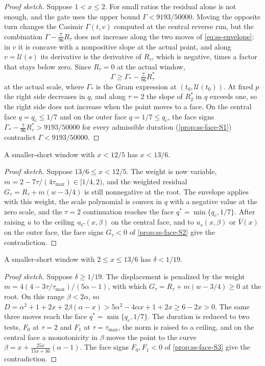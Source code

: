 \begin{proof}[Proof sketch]
Suppose $1<x\le2$. For small ratios the residual alone is not enough, and the gate uses the upper
bound $\Gamma<9193/50000$. Moving the opposite turn changes the Casimir $\Gamma(t,v)$ computed at
the central reverse run, but the combination $\Gamma-\frac{7}{96}R_\tau$ does not increase along
the two moves of \eqref{eq:ss-envelope}: in $v$ it is concave with a nonpositive slope at the
actual point, and along $v=\mathcal U(s)$ its derivative is the derivative of $R_\tau$, which is
negative, times a factor that stays below zero. Since $R_\tau=0$ at the actual window,
\[
  \Gamma\ge\Gamma_*-\tfrac{7}{96}R^*_\tau
\]
at the actual scale, where $\Gamma_*$ is the Gram expression at
$(t_0,\mathcal U(t_0))$. At fixed $p$ the right side decreases in $q$, and along $\tau=2$ the slope
of $R^*_2$ in $q$ exceeds one, so the right side does not increase when the point moves to a face.
On the central face $q=q_c\le1/7$ and on the outer face $q=1/7\le q_c$, the face signs
$\Gamma_*-\frac{7}{96}R^*_\tau>9193/50000$ for every admissible duration
(\cref{prop:ss-face-S1}) contradict $\Gamma<9193/50000$.
\end{proof}

\begin{proposition}[Gate S2]\label{prop:ss-S2}
A smaller-short window with $x<12/5$ has $x<13/6$.
\end{proposition}

\begin{proof}[Proof sketch]
Suppose $13/6\le x<12/5$. The weight is now variable, $m=2-7\tau/(4\tau_{\max})\in[1/4,2)$, and
the weighted residual $G_\tau=R_\tau+m(w-3/4)$ is still nonnegative at the root. The envelope
applies with this weight, the scale polynomial is convex in $q$ with a negative value at the zero
scale, and the $\tau=2$ continuation reaches the face $q^*=\min\{q_c,1/7\}$. After raising $u$ to
the ceiling $u_C(x,\beta)$ on the central face, and to $u_s(x,\beta)$ or $\bar V(x)$ on the outer
face, the face signs $G_\tau<0$ of \cref{prop:ss-face-S2} give the contradiction.
\end{proof}

\begin{proposition}[Gate S3]\label{prop:ss-S3}
A smaller-short window with $2\le x\le13/6$ has $\delta<1/19$.
\end{proposition}

\begin{proof}[Proof sketch]
Suppose $\delta\ge1/19$. The displacement is penalized by the weight
$m=4(4-3\tau/\tau_{\max})/(5\alpha-1)$, with which $G_\tau=R_\tau+m(w-3/4)\ge0$ at the root. On
this range $\beta<2\alpha$, so $D=\alpha^2+1+2x+2\beta(\alpha-x)>5\alpha^2-4\alpha x+1+2x\ge
6-2x>0$. The same three moves reach the face $q^*=\min\{q_c,1/7\}$. The duration is reduced to two
tests, $F_0$ at $\tau=2$ and $F_1$ at $\tau=\tau_{\max}$, the norm is raised to a ceiling, and on
the central face a monotonicity in $\beta$ moves the point to the curve
$\beta=x+\frac{25x}{15x+36}(\alpha-1)$. The face signs $F_0,F_1<0$ of
\cref{prop:ss-face-S3} give the contradiction.
\end{proof}

